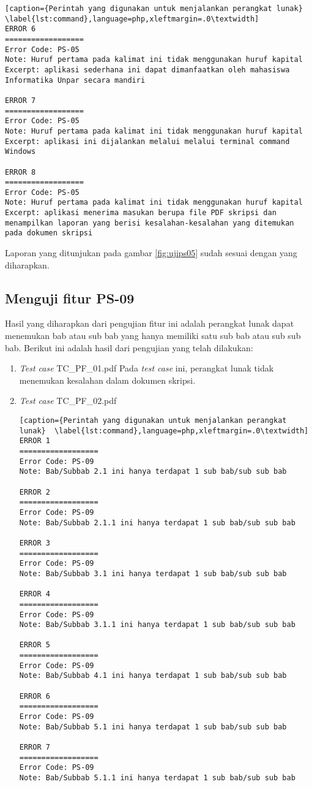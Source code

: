 \begin{enumerate}
\begin{lstlisting}[caption={Perintah yang digunakan untuk menjalankan perangkat lunak}	\label{lst:command},language=php,xleftmargin=.0\textwidth]
ERROR 6
==================
Error Code: PS-05
Note: Huruf pertama pada kalimat ini tidak menggunakan huruf kapital
Excerpt: aplikasi sederhana ini dapat dimanfaatkan oleh mahasiswa Informatika Unpar secara mandiri

ERROR 7
==================
Error Code: PS-05
Note: Huruf pertama pada kalimat ini tidak menggunakan huruf kapital
Excerpt: aplikasi ini dijalankan melalui melalui terminal command Windows 

ERROR 8
==================
Error Code: PS-05
Note: Huruf pertama pada kalimat ini tidak menggunakan huruf kapital
Excerpt: aplikasi menerima masukan berupa file PDF skripsi dan menampilkan laporan yang berisi kesalahan-kesalahan yang ditemukan pada dokumen skripsi
\end{lstlisting}
\end{enumerate}

Laporan yang ditunjukan pada gambar \ref{fig:ujips05} sudah sesuai dengan yang diharapkan.

\subsection{Menguji fitur PS-09}
Hasil yang diharapkan dari pengujian fitur ini adalah perangkat lunak dapat menemukan bab atau sub bab yang hanya memiliki satu sub bab atau sub sub bab. Berikut ini adalah hasil dari pengujian yang telah dilakukan:

\begin{enumerate}
	\item \textit{Test case} TC\_PF\_01.pdf
	Pada \textit{test case} ini, perangkat lunak tidak menemukan kesalahan dalam dokumen skripsi.
	
	\item \textit{Test case} TC\_PF\_02.pdf
	
\begin{lstlisting}[caption={Perintah yang digunakan untuk menjalankan perangkat lunak}	\label{lst:command},language=php,xleftmargin=.0\textwidth]
ERROR 1
==================
Error Code: PS-09
Note: Bab/Subbab 2.1 ini hanya terdapat 1 sub bab/sub sub bab

ERROR 2
==================
Error Code: PS-09
Note: Bab/Subbab 2.1.1 ini hanya terdapat 1 sub bab/sub sub bab

ERROR 3
==================
Error Code: PS-09
Note: Bab/Subbab 3.1 ini hanya terdapat 1 sub bab/sub sub bab

ERROR 4
==================
Error Code: PS-09
Note: Bab/Subbab 3.1.1 ini hanya terdapat 1 sub bab/sub sub bab

ERROR 5
==================
Error Code: PS-09
Note: Bab/Subbab 4.1 ini hanya terdapat 1 sub bab/sub sub bab

ERROR 6
==================
Error Code: PS-09
Note: Bab/Subbab 5.1 ini hanya terdapat 1 sub bab/sub sub bab

ERROR 7
==================
Error Code: PS-09
Note: Bab/Subbab 5.1.1 ini hanya terdapat 1 sub bab/sub sub bab
\end{lstlisting}
\end{enumerate}

